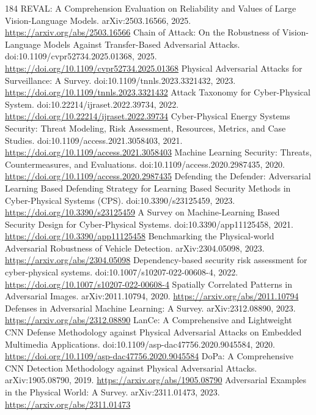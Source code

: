 \documentclass[11pt]{article}
\begin{document}
\begin{thebibliography}{184}
 REVAL: A Comprehension Evaluation on Reliability and Values of Large Vision-Language Models. arXiv:2503.16566, 2025. \url{https://arxiv.org/abs/2503.16566}
 Chain of Attack: On the Robustness of Vision-Language Models Against Transfer-Based Adversarial Attacks. doi:10.1109/cvpr52734.2025.01368, 2025. \url{https://doi.org/10.1109/cvpr52734.2025.01368}
 Physical Adversarial Attacks for Surveillance: A Survey. doi:10.1109/tnnls.2023.3321432, 2023. \url{https://doi.org/10.1109/tnnls.2023.3321432}
 Attack Taxonomy for Cyber-Physical System. doi:10.22214/ijraset.2022.39734, 2022. \url{https://doi.org/10.22214/ijraset.2022.39734}
 Cyber-Physical Energy Systems Security: Threat Modeling, Risk Assessment, Resources, Metrics, and Case Studies. doi:10.1109/access.2021.3058403, 2021. \url{https://doi.org/10.1109/access.2021.3058403}
 Machine Learning Security: Threats, Countermeasures, and Evaluations. doi:10.1109/access.2020.2987435, 2020. \url{https://doi.org/10.1109/access.2020.2987435}
 Defending the Defender: Adversarial Learning Based Defending Strategy for Learning Based Security Methods in Cyber-Physical Systems (CPS). doi:10.3390/s23125459, 2023. \url{https://doi.org/10.3390/s23125459}
 A Survey on Machine-Learning Based Security Design for Cyber-Physical Systems. doi:10.3390/app11125458, 2021. \url{https://doi.org/10.3390/app11125458}
 Benchmarking the Physical-world Adversarial Robustness of Vehicle Detection. arXiv:2304.05098, 2023. \url{https://arxiv.org/abs/2304.05098}
 Dependency-based security risk assessment for cyber-physical systems. doi:10.1007/s10207-022-00608-4, 2022. \url{https://doi.org/10.1007/s10207-022-00608-4}
 Spatially Correlated Patterns in Adversarial Images. arXiv:2011.10794, 2020. \url{https://arxiv.org/abs/2011.10794}
 Defenses in Adversarial Machine Learning: A Survey. arXiv:2312.08890, 2023. \url{https://arxiv.org/abs/2312.08890}
 LanCe: A Comprehensive and Lightweight CNN Defense Methodology against Physical Adversarial Attacks on Embedded Multimedia Applications. doi:10.1109/asp-dac47756.2020.9045584, 2020. \url{https://doi.org/10.1109/asp-dac47756.2020.9045584}
 DoPa: A Comprehensive CNN Detection Methodology against Physical Adversarial Attacks. arXiv:1905.08790, 2019. \url{https://arxiv.org/abs/1905.08790}
 Adversarial Examples in the Physical World: A Survey. arXiv:2311.01473, 2023. \url{https://arxiv.org/abs/2311.01473}

\end{thebibliography}
\end{document}
